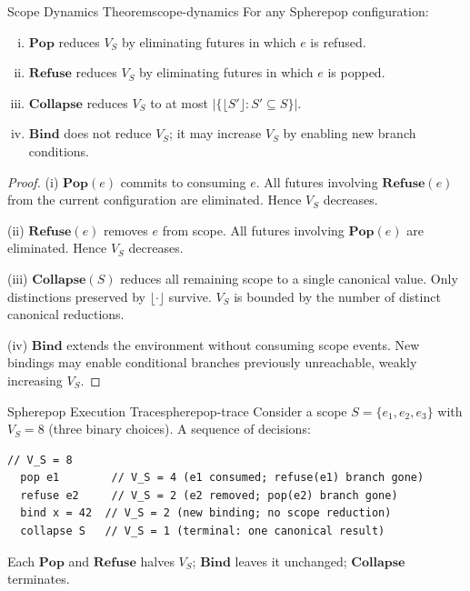\documentclass[12pt,twoside,openright]{book}
\newcommand{\csicon} {\marginpar{\tiny\color{DistBlue}\faCode}}
\begin{document}
\begin{theorem}{Scope Dynamics Theorem}{scope-dynamics}
  For any Spherepop configuration:
  \begin{enumerate}[(i)]
    \item $\mathbf{Pop}$ reduces $V_S$ by eliminating
          futures in which $e$ is refused.
    \item $\mathbf{Refuse}$ reduces $V_S$ by eliminating
          futures in which $e$ is popped.
    \item $\mathbf{Collapse}$ reduces $V_S$ to at most
          $|\{\lfloor S' \rfloor : S' \subseteq S\}|$.
    \item $\mathbf{Bind}$ does not reduce $V_S$; it may
          increase $V_S$ by enabling new branch conditions.
  \end{enumerate}
\end{theorem}

\begin{proof}
  (i) $\mathbf{Pop}(e)$ commits to consuming $e$.
  All futures involving $\mathbf{Refuse}(e)$ from the
  current configuration are eliminated.
  Hence $V_S$ decreases.

  (ii) $\mathbf{Refuse}(e)$ removes $e$ from scope.
  All futures involving $\mathbf{Pop}(e)$ are eliminated.
  Hence $V_S$ decreases.

  (iii) $\mathbf{Collapse}(S)$ reduces all remaining
  scope to a single canonical value. Only distinctions
  preserved by $\lfloor \cdot \rfloor$ survive.
  $V_S$ is bounded by the number of distinct canonical
  reductions.

  (iv) $\mathbf{Bind}$ extends the environment without
  consuming scope events. New bindings may enable
  conditional branches previously unreachable, weakly
  increasing $V_S$.
\end{proof}

\begin{example}{Spherepop Execution Trace}{spherepop-trace}
  \csicon
  Consider a scope $S = \{e_1, e_2, e_3\}$ with
  $V_S = 8$ (three binary choices). A sequence of
  decisions:
  \begin{lstlisting}[language=Spherepop]
  // V_S = 8
  pop e1        // V_S = 4 (e1 consumed; refuse(e1) branch gone)
  refuse e2     // V_S = 2 (e2 removed; pop(e2) branch gone)
  bind x = 42  // V_S = 2 (new binding; no scope reduction)
  collapse S   // V_S = 1 (terminal: one canonical result)
  \end{lstlisting}
  Each $\mathbf{Pop}$ and $\mathbf{Refuse}$ halves
  $V_S$; $\mathbf{Bind}$ leaves it unchanged;
  $\mathbf{Collapse}$ terminates.
\end{example}
\end{document}

